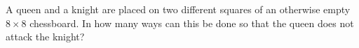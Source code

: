 A queen and a knight are placed on two different squares of an otherwise empty $8\times8$ chessboard. In how many ways can this be done so that the queen does not attack the knight?
